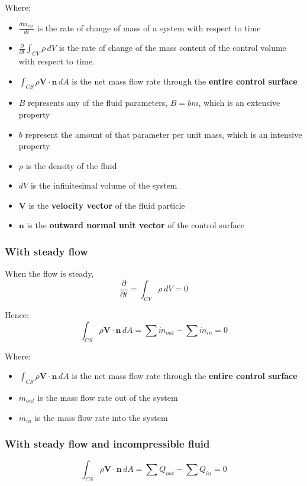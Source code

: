 \documentclass[11pt]{article}
\begin{document}
Where:
\begin{itemize}
\item \(\frac{dm_{sys}}{dt}\) is the rate of change of mass of a system with respect to time
\item \(\frac{\partial}{\partial t} \int_{CV} \rho \, dV\) is the rate of change of the mass content of the control volume with respect to time.
\item \(\int_{CS} \rho \boldsymbol{V} \cdot \boldsymbol{n} \, dA\) is the net mass flow rate through the \textbf{entire control surface}
\item \(B\) represents any of the fluid parameters, \(B = bm\), which is an extensive property
\item \(b\) represent the amount of that parameter per unit mass, which is an intensive property
\item \(\rho\) is the density of the fluid
\item \(dV\) is the infinitesimal volume of the system
\item \(\boldsymbol{V}\) is the \textbf{velocity vector} of the fluid particle
\item \(\boldsymbol{n}\) is the \textbf{outward normal unit vector} of the control surface
\end{itemize}

\newpage

\subsubsection{With steady flow}
\label{sec:org9c68d3d}
When the flow is steady,
\[\frac{\partial}{\partial t} = \int_{CV} \rho \, dV = 0\]

Hence:
\[\int_{CS} \rho \boldsymbol{V} \cdot \boldsymbol{n} \, dA = \sum \dot{m}_{out} - \sum \dot{m}_{in} = 0\]

Where:
\begin{itemize}
\item \(\int_{CS} \rho \boldsymbol{V} \cdot \boldsymbol{n} \, dA\) is the net mass flow rate through the \textbf{entire control surface}
\item \(\dot{m}_{out}\) is the mass flow rate out of the system
\item \(\dot{m}_{in}\) is the mass flow rate into the system
\end{itemize}

\subsubsection{With steady flow and incompressible fluid}
\label{sec:org951767c}
\[\int_{CS} \rho \boldsymbol{V} \cdot \boldsymbol{n} \, dA = \sum Q_{out} - \sum Q_{in} = 0\]
\end{document}
